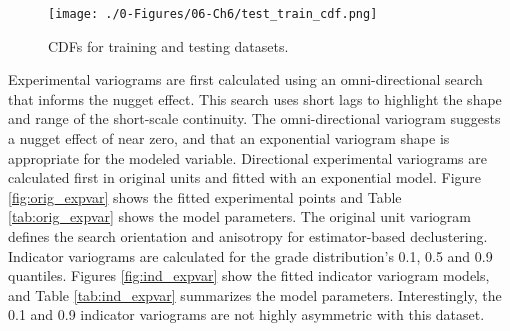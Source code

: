 \begin{figure}[htb!]
    \centering
    \texttt{[image: ./0-Figures/06-Ch6/test\_train\_cdf.png]}
    \caption{ \Glspl{CDF} for training and testing datasets. }
    \label{fig:datasets}
\end{figure}

Experimental variograms are first calculated using an omni-directional search that informs the nugget effect. This search uses short lags to highlight the shape and range of the short-scale continuity. The omni-directional variogram suggests a nugget effect of near zero, and that an exponential variogram shape is appropriate for the modeled variable. Directional experimental variograms are calculated first in original units and fitted with an exponential model. Figure \ref{fig:orig_expvar} shows the fitted experimental points and Table \ref{tab:orig_expvar} shows the model parameters. The original unit variogram defines the search orientation and anisotropy for estimator-based declustering. Indicator variograms are calculated for the grade distribution's 0.1, 0.5 and 0.9 quantiles. Figures \ref{fig:ind_expvar} show the fitted indicator variogram models, and Table \ref{tab:ind_expvar} summarizes the model parameters. Interestingly, the 0.1 and 0.9 indicator variograms are not highly asymmetric with this dataset.




